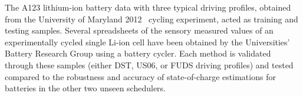 The A123 lithium-ion battery data with three typical driving profiles, obtained from the University of Maryland 2012~\cite{noauthor_calce_2017} cycling experiment, acted as training and testing samples.
Several spreadsheets of the sensory measured values of an experimentally cycled single Li-ion cell have been obtained by the Universities' Battery Research Group using a battery cycler.
Each method is validated through these samples (either DST, US06, or FUDS driving profiles) and tested compared to the robustness and accuracy of state-of-charge estimations for batteries in the other two unseen schedulers.

